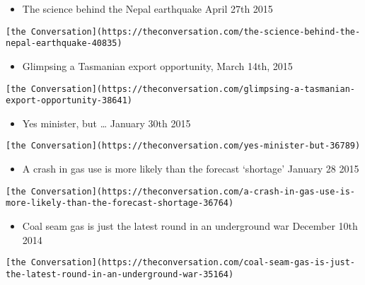 \documentclass[
]{article}
\providecommand{\tightlist}{%
  \setlength{\itemsep}{0pt}\setlength{\parskip}{0pt}}
\begin{document}
\begin{itemize}
\tightlist
\item
  The science behind the Nepal earthquake April 27th 2015
\end{itemize}

\begin{verbatim}
[the Conversation](https://theconversation.com/the-science-behind-the-nepal-earthquake-40835)
\end{verbatim}

\begin{itemize}
\tightlist
\item
  Glimpsing a Tasmanian export opportunity, March 14th, 2015
\end{itemize}

\begin{verbatim}
[the Conversation](https://theconversation.com/glimpsing-a-tasmanian-export-opportunity-38641)
\end{verbatim}

\begin{itemize}
\tightlist
\item
  Yes minister, but \ldots{} January 30th 2015
\end{itemize}

\begin{verbatim}
[the Conversation](https://theconversation.com/yes-minister-but-36789)
\end{verbatim}

\begin{itemize}
\tightlist
\item
  A crash in gas use is more likely than the forecast `shortage' January
  28 2015
\end{itemize}

\begin{verbatim}
[the Conversation](https://theconversation.com/a-crash-in-gas-use-is-more-likely-than-the-forecast-shortage-36764)
\end{verbatim}

\begin{itemize}
\tightlist
\item
  Coal seam gas is just the latest round in an underground war December
  10th 2014
\end{itemize}

\begin{verbatim}
[the Conversation](https://theconversation.com/coal-seam-gas-is-just-the-latest-round-in-an-underground-war-35164)
\end{verbatim}
\end{document}
